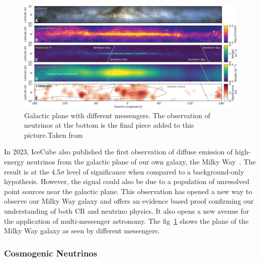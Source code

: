   \begin{figure}[t!]
    \centering
    \includegraphics[width=14.5cm]{thesis_figures/CRnNu/science-adc9818-f1.jpg}
    \caption{Galactic plane with different messengers. The observation of neutrinos at the bottom is the final piece added to this picture.Taken from~\cite{Galactic_plane_nu_2023}}
    \label{fig:Galactic_plane_nu_messengers}
  \end{figure}

  In 2023, IceCube also published the first observation of diffuse emission of high-energy neutrinos from the galactic plane of our own galaxy, the Milky Way~\cite{Galactic_plane_nu_2023}. The result is at the 4.5$\sigma$ level of significance when compared to a background-only hypothesis. However, the signal could also be due to a population of unresolved point sources near the galactic plane. This observation has opened a new way to observe our Milky Way galaxy and offers an evidence based proof confirming our understanding of both \gls{CR} and neutrino physics. It also opens a new avenue for the application of multi-messenger astronomy. The fig~\ref{fig:Galactic_plane_nu_messengers} shows the plane of the Milky Way galaxy as seen by different messengers.
  
\subsubsection*{Cosmogenic Neutrinos}

